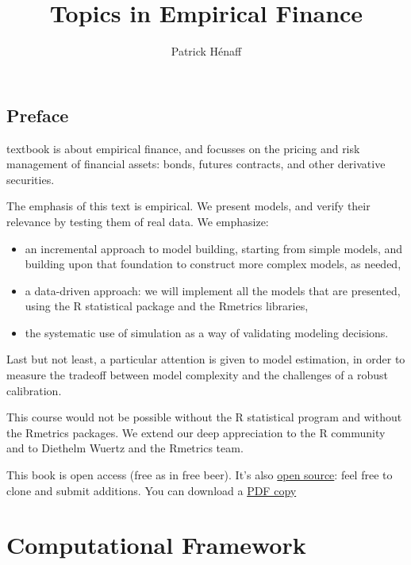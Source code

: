 \documentclass[justified]{tufte-book}
\title{Topics in Empirical Finance}
\author{Patrick Hénaff}
\date{}
\newcommand{\RR}{\textsf{R}}
\begin{document}
\maketitle



{
\setcounter{tocdepth}{0}
\tableofcontents
}

\hypertarget{preface}{%
\chapter*{Preface}\label{preface}}

 textbook is about empirical finance, and focusses on the pricing and risk management of financial assets: bonds, futures contracts, and other derivative securities.

The emphasis of this text is empirical. We present models, and verify their relevance by testing them of real data. We emphasize:

\begin{itemize}
\item an incremental approach to model building, starting from simple models, and building upon that foundation to construct more complex models, as needed,
\item a data-driven approach: we will implement all the models that are presented, using the R statistical package and the Rmetrics libraries,
\item the systematic use of simulation as a way of validating modeling decisions.
\end{itemize}

Last but not least, a particular attention is given to model estimation, in order to measure the tradeoff between model complexity and the challenges of a robust calibration.

This course would not be possible without the \RR{} statistical program and without the Rmetrics packages. We extend our deep appreciation to the \RR{} community and to Diethelm Wuertz and the Rmetrics team.

This book is open access (free as in free beer). It's also \href{https://github.com/phenaff/empirical-finance-2}{open source}: feel free to clone and submit additions.
You can download a \href{https://github.com/phenaff/empirical-finance-2/docs/empiricalfin.pdf}{PDF copy}

\hypertarget{part-computational-framework}{%
\part*{Computational Framework}\label{part-computational-framework}}
\end{document}
